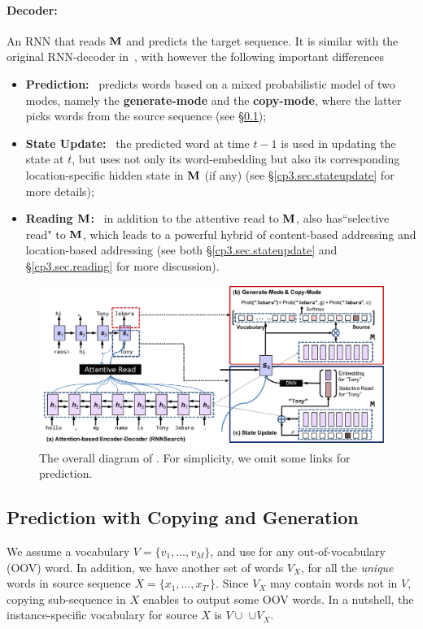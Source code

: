 \paragraph{Decoder:}  An RNN that reads $\mathbf{M}$ 
and predicts the target sequence. It is similar with the original RNN-decoder in~\cite{bahdanau2014neural}, with however the following important differences 
\begin{itemize}
    \item {\bf Prediction:}~ \copynet predicts words based on a mixed probabilistic model of two modes, namely the \textbf{generate-mode} and the \textbf{copy-mode}, where the latter picks words from the source sequence (see \S\ref{cp3.sec.predict});
	\item {\bf  State Update:}~ the predicted word at time $t-1$ is used in updating the state at $t$, but \copynet uses not only its word-embedding but also its corresponding location-specific hidden state in $\mathbf{M}$ (if any) (see \S\ref{cp3.sec.stateupdate} for more details);
	\item {\bf Reading $\mathbf{M}$:}~ in addition to the attentive read to $\mathbf{M}$, \copynet also has``selective read" to $\mathbf{M}$, which leads to a powerful hybrid of content-based addressing and location-based addressing (see both \S\ref{cp3.sec.stateupdate} and \S\ref{cp3.sec.reading} for more discussion).
\end{itemize}
 \begin{figure}[htbp]
   	\centering
          	\includegraphics[width=1\linewidth]{figs/copynet/model-x.pdf} 
			  \caption{\label{cp3.fig.model} The overall diagram of \copynet. For simplicity, we omit some links for prediction. }
   \end{figure} 
   
\subsection{Prediction with Copying and Generation}
\label{cp3.sec.predict}
We assume a vocabulary $V=\{v_1, ..., v_M\}$, and use \unk for any out-of-vocabulary (OOV) word. 
In addition, we have another set of words $V_X$, for all the 
\emph{unique} words in source sequence $X=\{x_1, ..., x_{T'}\}$.
Since $V_X$ may contain words not in $V$, copying sub-sequence in $X$ enables 
\copynet to output some OOV words. 
In a nutshell, the instance-specific vocabulary for source $X$ is $V \cup$ \unk $\cup V_X$.


